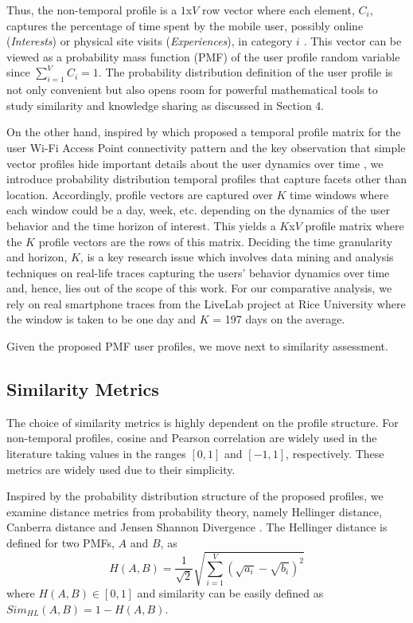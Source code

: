 \documentclass[12pt,epsf]{article}
\theoremstyle{definition}
\begin{document}
Thus, the non-temporal profile is a $1$x$V$ row vector where each element, $C_i$, 
captures the percentage of time spent by the mobile user, possibly online 
({\it Interests}) or physical site visits ({\it Experiences}), in category $i$ 
\cite{Mai13}. This vector can be viewed as a probability mass function 
(PMF) of the user profile random variable since $\sum_{i=1}^V C_i=1$. The 
probability distribution definition of the user profile is not only convenient 
but also opens room for powerful mathematical tools to study similarity 
and knowledge sharing as discussed in Section 4.

On the other hand, inspired by \cite{csi} which proposed a temporal profile matrix for the 
user Wi-Fi Access Point connectivity pattern and the key observation 
that simple vector profiles hide important details about the user 
dynamics over time \cite{Mai13}, we introduce probability distribution temporal 
profiles that capture facets other than location. Accordingly, 
profile vectors are captured over $K$ time windows where each window could 
be a day, week, etc. depending on the dynamics of the user behavior and the 
time horizon of interest. This yields a $K$x$V$ profile matrix where the $K$ profile 
vectors are the rows of this matrix. Deciding the time granularity and horizon, 
$K$, is a key research issue which involves data mining and analysis techniques 
on real-life traces capturing the users' behavior dynamics over time and, hence, lies out of 
the scope of this work. For our comparative analysis, we rely on real
smartphone traces from the LiveLab project at Rice University \cite{data} where the 
window is taken to be one day and $K$ = 197 days on the average.

Given the proposed PMF user profiles, we move next to
similarity assessment.
%
\vspace{-0.4 cm}
\subsection{Similarity Metrics}
\vspace{-0.2 cm}
The choice of similarity metrics is highly dependent on the
profile structure. For non-temporal profiles, cosine and Pearson
correlation are widely used in the literature \cite{sim}
taking values in the ranges $[0,1]$ and $[-1,1]$, respectively.
These metrics are widely used due to their simplicity. 

Inspired by the probability distribution structure of the proposed 
profiles, we examine distance metrics from probability theory, 
namely Hellinger distance, Canberra distance and Jensen Shannon 
Divergence \cite{sm}. The Hellinger distance is defined for two 
PMFs, $A$ and $B$, as \cite{sm} 
\begin{equation}
H(A,B)= \frac{1}{\sqrt{2}}\sqrt{ \sum\limits_{i=1}^{V}{(\sqrt{a_i}-\sqrt{b_i})^2}} 
\nonumber
\end{equation}
where $H(A,B) \in [0,1]$ and similarity can be easily defined as $Sim_{HL}(A, B)=1-H(A,B)$.
\end{document}
